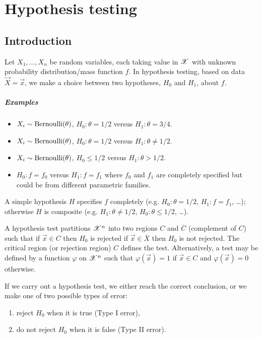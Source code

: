
\chapter{Hypothesis testing}

\section{Introduction}

Let $X_1, \dotsc, X_n$ be \iid random variables, each taking value in $\mathscr{X}$ with unknown probability distribution/mass function $f$.
In hypothesis testing, based on data $\vec{X} = \vec{x}$, we make a choice between two hypotheses, $H_0$ and $H_1$, about $f$.

\paragraph{Examples}
\begin{itemize}
\item $X_i \sim \operatorname{Bernoulli}(\theta)$, $H_0 : \theta = 1/2$ versus $H_1 : \theta = 3/4$.
\item $X_i \sim \operatorname{Bernoulli}(\theta)$, $H_0 : \theta = 1/2$ versus $H_1 : \theta \neq 1/2$.
\item $X_i \sim \operatorname{Bernoulli}(\theta)$, $H_0 \leq 1/2$ versus $H_1 : \theta > 1/2$.
\item $H_0 : f = f_0$ versus $H_1 : f = f_1$ where $f_0$ and $f_1$ are completely specified but could be from different parametric families.
\end{itemize}

A simple hypothesis $H$ specifies $f$ completely (e.g. $H_0 : \theta = 1/2$, $H_1 : f = f_1$, \dots); otherwise $H$ is composite (e.g. $H_1 : \theta \neq 1/2$, $H_0 : \theta \leq 1/2$, \dots).

A hypothesis test partitions $\mathscr{X}^n$ into two regions $C$ and $\overline{C}$ (complement of $C$) such that if $\vec{x} \in C$ then $H_0$ is rejected if $\vec{x} \in \overline{X}$ then $H_0$ is not rejected.
The critical region (or rejection region) $C$ defines the test.
Alternatively, a test may be defined by a function $\varphi$ on $\mathscr{X}^n$ such that $\varphi(\vec{x}) = 1$ if $\vec{x} \in C$ and $\varphi(\vec{x}) = 0$ otherwise.

If we carry out a hypothesis test, we either reach the correct conclusion, or we make one of two possible types of error:
\begin{enumerate}
\item reject $H_0$ when it is true (Type I error),
\item do not reject $H_0$ when it is false (Type II error).
\end{enumerate}

